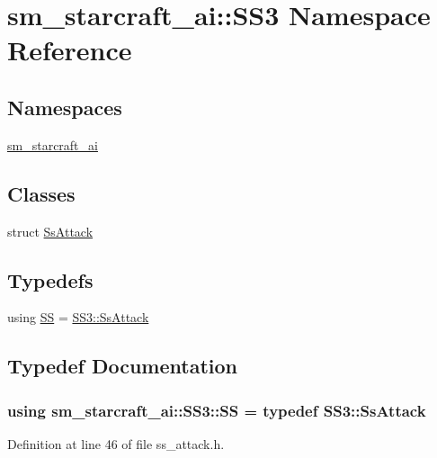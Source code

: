 \hypertarget{namespacesm__starcraft__ai_1_1SS3}{}\section{sm\+\_\+starcraft\+\_\+ai\+:\+:S\+S3 Namespace Reference}
\label{namespacesm__starcraft__ai_1_1SS3}
\subsection*{Namespaces}
\begin{DoxyCompactItemize}
\item 
 \hyperlink{namespacesm__starcraft__ai_1_1SS3_1_1sm__starcraft__ai}{sm\+\_\+starcraft\+\_\+ai}
\end{DoxyCompactItemize}
\subsection*{Classes}
\begin{DoxyCompactItemize}
\item 
struct \hyperlink{structsm__starcraft__ai_1_1SS3_1_1SsAttack}{Ss\+Attack}
\end{DoxyCompactItemize}
\subsection*{Typedefs}
\begin{DoxyCompactItemize}
\item 
using \hyperlink{namespacesm__starcraft__ai_1_1SS3_a0614e8e9c4f66c30ae846ab556b4dd1e}{SS} = \hyperlink{structsm__starcraft__ai_1_1SS3_1_1SsAttack}{S\+S3\+::\+Ss\+Attack}
\end{DoxyCompactItemize}


\subsection{Typedef Documentation}
\subsubsection[{\texorpdfstring{SS}{SS}}]{\setlength{\rightskip}{0pt plus 5cm}using {\bf sm\+\_\+starcraft\+\_\+ai\+::\+S\+S3\+::\+SS} = typedef {\bf S\+S3\+::\+Ss\+Attack}}\hypertarget{namespacesm__starcraft__ai_1_1SS3_a0614e8e9c4f66c30ae846ab556b4dd1e}{}\label{namespacesm__starcraft__ai_1_1SS3_a0614e8e9c4f66c30ae846ab556b4dd1e}


Definition at line 46 of file ss\+\_\+attack.\+h.

